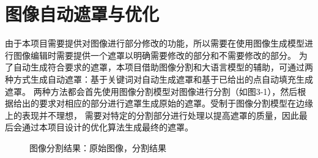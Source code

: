 \documentclass[a4paper,AutoFakeBold,oneside,12pt]{book}
\begin{document}
\section{图像自动遮罩与优化}
由于本项目需要提供对图像进行部分修改的功能，所以需要在使用图像生成模型进行图像编辑时需要提供一个遮罩以明确需要修改的部分和不需要修改的部分。
为了自动生成符合要求的遮罩，本项目借助图像分割和大语言模型的辅助，可通过两种方式生成自动遮罩：基于关键词对自动生成遮罩和基于已给出的点自动填充生成遮罩。
两种方法都会首先使用图像分割模型对图像进行分割（如图3-1），然后根据给出的要求对相应的部分进行遮罩生成原始的遮罩。受制于图像分割模型在边缘上的表现并不理想，
需要对特定的分割部分进行处理以提高遮罩的质量，因此最后会通过本项目设计的优化算法生成最终的遮罩。
\begin{figure}[!htbp]
    \centering
    \quad %
    \caption{图像分割结果：\protect{}原始图像，\protect{}分割结果} %
    \label{Fig:Segment} %
\end{figure}
\end{document}
